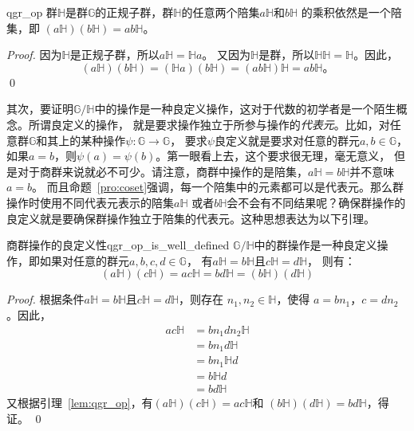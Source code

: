 \begin{lemma}{}{qgr_op}
群$\mathbb{H}$是群$\mathbb{G}$的正规子群，群$\mathbb{H}$的任意两个陪集$a \mathbb{H}$和$ b \mathbb{H}$
的乘积依然是一个陪集，即
$(a \mathbb{H}) (b \mathbb{H}) = ab \mathbb{H}$。
\end{lemma}
	
\begin{proof}
	因为$\mathbb{H}$是正规子群，所以$a \mathbb{H} = \mathbb{H}a$。
	又因为$\mathbb{H}$是群，所以$\mathbb{H} \mathbb{H}= \mathbb{H}$。因此，
	\[(a \mathbb{H}) (b \mathbb{H}) = (\mathbb{H}a) (b \mathbb{H}) = (a b \mathbb{H}) \mathbb{H} = ab \mathbb{H}\text{。}\]
	\qed
\end{proof}
其次，要证明$\mathbb{G}/ \mathbb{H}$中的操作是一种良定义操作，这对于代数的初学者是一个陌生概念。所谓良定义的操作，
就是要求操作独立于所参与操作的\emph{代表元}。比如，对任意群$\mathbb{G}$和其上的某种操作$\psi\colon \mathbb{G}\to \mathbb{G}$，
要求$\psi$良定义就是要求对任意的群元$a, b\in \mathbb{G}$，如果$a = b$，则$\psi(a) = \psi(b)$。第一眼看上去，这个要求很无理，毫无意义，
但是对于商群来说就必不可少。请注意，商群中操作的是陪集，$a\mathbb{H}= b\mathbb{H}$并不意味$a=b$。
而且命题~\ref{pro:coset}强调，每一个陪集中的元素都可以是代表元。那么群操作时使用不同代表元表示的陪集$a\mathbb{H}$
或者$b\mathbb{H}$会不会有不同结果呢？确保群操作的良定义就是要确保群操作独立于陪集的代表元。这种思想表达为以下引理。

\begin{lemma}{商群操作的良定义性}{qgr_op_is_well_defined}
$\mathbb{G}/ \mathbb{H}$中的群操作是一种良定义操作，即如果对任意的群元$a, b, c , d \in \mathbb{G}$，
有$a \mathbb{H} = b \mathbb{H}$且$c \mathbb{H} = d\mathbb{H}$，
则有：
			\[(a\mathbb{H})(c\mathbb{H}) = a c\mathbb{H} = bd \mathbb{H} = (b\mathbb{H})(d\mathbb{H})\]
\end{lemma}

\begin{proof}
根据条件$a \mathbb{H} = b \mathbb{H}$且$c \mathbb{H} = d\mathbb{H}$，则存在 $n_1, n_2 \in\mathbb{H}$，使得
$a = b n_1$，$c = dn_2$。因此，
	\begin{align*}
	ac \mathbb{H} &= b n_1 d n_2 \mathbb{H} \\
	&= b n_1 d \mathbb{H} \\
	&= b n_1 \mathbb{H} d \\
	&= b \mathbb{H} d \\
	&= bd \mathbb{H}
	\end{align*}
又根据引理~\ref{lem:qgr_op}，有$(a \mathbb{H}) (c\mathbb{H}) = ac \mathbb{H}$和
$(b \mathbb{H}) (d\mathbb{H}) = bd \mathbb{H}$，得证。
\qed
\end{proof}
	
